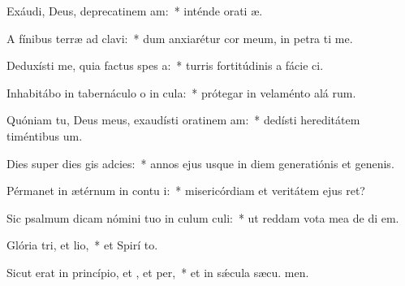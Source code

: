 \item Exáudi, Deus, deprecatinem am:~* inténde orati æ.
\item A fínibus terræ ad  clavi:~* dum anxiarétur cor meum, in petra ti me.
\item Deduxísti me, quia factus  spes a:~* turris fortitúdinis a fácie ci.
\item Inhabitábo in tabernáculo o in cula:~* prótegar in velaménto alá rum.
\item Quóniam tu, Deus meus, exaudísti oratinem am:~* dedísti hereditátem timéntibus  um.
\item Dies super dies gis adcies:~* annos ejus usque in diem generatiónis et genenis.
\item Pérmanet in ætérnum in contu i:~* misericórdiam et veritátem ejus  ret?
\item Sic psalmum dicam nómini tuo in culum culi:~* ut reddam vota mea de di  em.
\item Glória tri, et lio,~* et Spirí to.
\item Sicut erat in princípio, et , et per,~* et in sǽcula sæcu. men.
